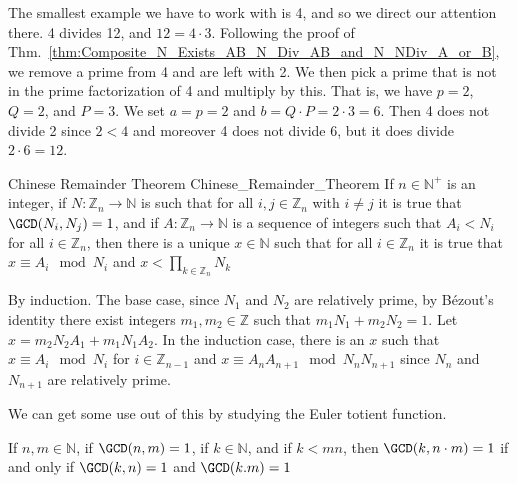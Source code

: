 \documentclass{article}                                                        %
\begin{document}
            \begin{example}
                The smallest example we have to work with is 4, and so we direct
                our attention there. 4 divides 12, and $12=4\cdot{3}$. Following
                the proof of
                Thm.~\ref{thm:Composite_N_Exists_AB_N_Div_AB_and_N_NDiv_A_or_B},
                we remove a prime from 4 and are left with 2. We then pick a
                prime that is not in the prime factorization of 4 and multiply
                by this. That is, we have $p=2$, $Q=2$, and $P=3$. We set
                $a=p=2$ and $b=Q\cdot{P}=2\cdot{3}=6$. Then 4 does not divide 2
                since $2<4$ and moreover 4 does not divide 6, but it does divide
                $2\cdot{6}=12$.
            \end{example}
            \begin{ftheorem}{Chinese Remainder Theorem}
                            {Chinese_Remainder_Theorem}
                If $n\in\mathbb{N}^{+}$ is an integer, if
                $N:\mathbb{Z}_{n}\rightarrow\mathbb{N}$ is such that for all
                $i,j\in\mathbb{Z}_{n}$ with $i\ne{j}$ it is true that
                $\GCD(N_{i},N_{j})=1$, and if
                $A:\mathbb{Z}_{n}\rightarrow\mathbb{N}$ is a sequence of
                integers such that $A_{i}<N_{i}$ for all $i\in\mathbb{Z}_{n}$,
                then there is a unique $x\in\mathbb{N}$ such that for all
                $i\in\mathbb{Z}_{n}$ it is true that $x\equiv{A}_{i}\mod{N}_{i}$
                and $x<\prod_{k\in\mathbb{Z}_{n}}N_{k}$
            \end{ftheorem}
            \begin{bproof}
                By induction. The base case, since $N_{1}$ and $N_{2}$ are
                relatively prime, by B\'{e}zout's identity there exist integers
                $m_{1},m_{2}\in\mathbb{Z}$ such that $m_{1}N_{1}+m_{2}N_{2}=1$.
                Let $x=m_{2}N_{2}A_{1}+m_{1}N_{1}A_{2}$. In the induction case,
                there is an $x$ such that $x\equiv{A}_{i}\mod{N}_{i}$ for
                $i\in\mathbb{Z}_{n-1}$ and $x\equiv{A}_{n}A_{n+1}\mod{N}_{n}N_{n+1}$
                since $N_{n}$ and $N_{n+1}$ are relatively prime.
            \end{bproof}
            We can get some use out of this by studying the Euler totient
            function.
            \begin{theorem}
                \label{thm:Rel_Prime_to_Prod_of_Rel_Primes}%
                If $n,m\in\mathbb{N}$, if $\GCD(n,m)=1$, if $k\in\mathbb{N}$,
                and if $k<mn$, then $\GCD(k,n\cdot{m})=1$ if and only if
                $\GCD(k,n)=1$ and $\GCD(k.m)=1$
            \end{theorem}
\end{document}
